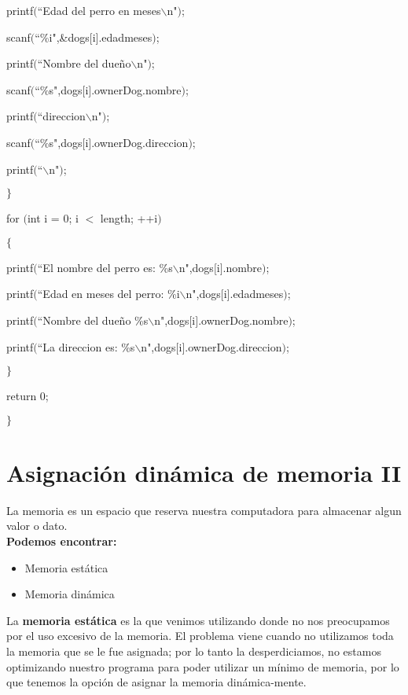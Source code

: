 \documentclass[]{article}
\begin{document}
	printf$($``Edad del perro en meses$\backslash$n"$)$;
	
	scanf$($``\%i",\&dogs$[$i$]$.edadmeses$)$;
	
	printf$($``Nombre del dueño$\backslash$n"$)$;
	
	scanf$($``\%s",dogs$[$i$]$.ownerDog.nombre$)$;
	
	printf$($``direccion$\backslash$n"$)$;
	
	scanf$($``\%s",dogs$[$i$]$.ownerDog.direccion$)$;
	
	printf$($``$\backslash$n"$)$;
	
	$\rbrace$
	
	for $($int i = 0; i $<$ length; ++i$)$
	
	$\lbrace$
	
	printf$($``El nombre del perro es: \%s$\backslash$n",dogs$[$i$]$.nombre$)$;
	
	printf$($``Edad en meses del perro: \%i$\backslash$n",dogs$[$i$]$.edadmeses$)$;
	
	printf$($``Nombre del dueño \%s$\backslash$n",dogs$[$i$]$.ownerDog.nombre$)$;
	
	printf$($``La direccion es: \%s$\backslash$n",dogs$[$i$]$.ownerDog.direccion$)$;
	
	$\rbrace$
	
	return 0;
	
	$\rbrace$
	
	\section{Asignación dinámica de memoria II}
	
	La memoria es un espacio que reserva nuestra computadora para almacenar algun valor o dato.\\
	
	\textbf{Podemos encontrar:}
	
	\begin{itemize}
		\item Memoria estática
		\item Memoria dinámica
	\end{itemize}
	
	La \textbf{memoria estática} es la que venimos utilizando donde no nos preocupamos por el uso excesivo de la memoria. El problema viene cuando no utilizamos toda la memoria que se le fue asignada; por lo tanto la desperdiciamos, no estamos optimizando nuestro programa para poder utilizar un mínimo de memoria, por lo que tenemos la opción de asignar la memoria dinámica-mente.\\
	
\end{document}
